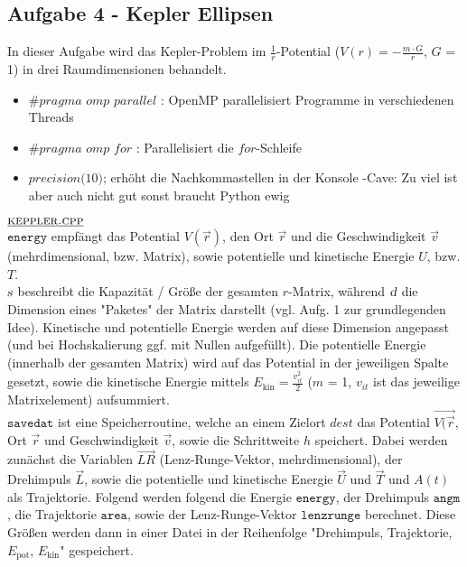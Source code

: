 \subsection*{Aufgabe 4 - Kepler Ellipsen}
In dieser Aufgabe wird das Kepler-Problem im $\frac{1}{r}$-Potential ($V(r) = -\frac{m \cdot G}{r}$, $G$ = 1) in drei Raumdimensionen behandelt.
	\begin{itemize}
		\item  $\textit{\#pragma omp parallel}$ : OpenMP parallelisiert Programme in verschiedenen Threads
		\item  $\textit{\#pragma omp for}$ : Parallelisiert die $\textit{for}$-Schleife
		\item $\textit{precision(10);}$ erhöht die Nachkommastellen in der Konsole -Cave: Zu viel ist aber auch nicht gut sonst braucht Python ewig
	\end{itemize}

	$\underline{\textsc{keppler.cpp}}$ \\
	$\texttt{energy}$ empfängt das Potential $V(\vec{r})$, den Ort $\vec{r}$ und die Geschwindigkeit $\vec{v}$ (mehrdimensional, bzw. Matrix), sowie potentielle und kinetische Energie $U$, bzw. $T$. \\
	$\textsl{s}$ beschreibt die Kapazität / Größe der gesamten $r$-Matrix, während $\textsl{d}$ die Dimension eines "Paketes" der Matrix darstellt (vgl. Aufg. 1 zur grundlegenden Idee). Kinetische und potentielle Energie werden auf diese Dimension angepasst (und bei Hochskalierung ggf. mit Nullen aufgefüllt). Die potentielle Energie (innerhalb der gesamten Matrix) wird auf das Potential in der jeweiligen Spalte gesetzt, sowie die kinetische Energie mittels $E_{\text{kin}} = \frac{v_{it}^2}{2}$ ($m$ = 1, $v_{it}$ ist das jeweilige Matrixelement) aufsummiert.\\
	
	$\texttt{savedat}$ ist eine Speicherroutine, welche an einem Zielort $\textit{dest}$ das Potential $\vec{V(\vec{r}}$, Ort $\vec{r}$ und Geschwindigkeit $\vec{v}$, sowie die Schrittweite $h$ speichert.
	Dabei werden zunächst die Variablen $\vec{LR}$ (Lenz-Runge-Vektor, mehrdimensional), der Drehimpuls $\vec{L}$, sowie die potentielle und kinetische Energie $\vec{U}$ und $\vec{T}$ und $A(t)$ als Trajektorie.
	Folgend werden folgend die Energie $\texttt{energy}$, der Drehimpuls $\texttt{angm}$, die Trajektorie $\texttt{area}$, sowie der Lenz-Runge-Vektor $\texttt{lenzrunge}$ berechnet. Diese Größen werden dann in einer Datei in der Reihenfolge "Drehimpuls, Trajektorie, $E_{\text{pot}}$, $E_{\text{kin}}$" gespeichert.\\
	
